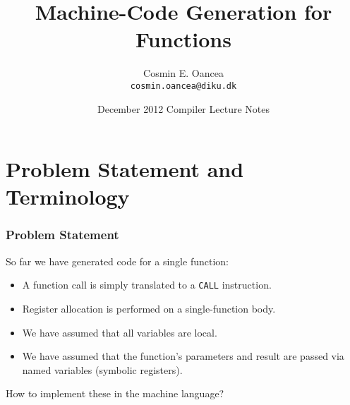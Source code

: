 \documentclass{beamer}
\title[Functions]{Machine-Code Generation for Functions}
\author[C.~Oancea]{Cosmin E. Oancea\\{\tt cosmin.oancea@diku.dk}}
\institute{Department of Computer Science (DIKU)\\University of Copenhagen}
\date[December 2012]{December 2012 Compiler Lecture Notes}
\newcommand{\emp}[1]{\textcolor{DikuRed}{ #1}}
\begin{document}
\titleslide



\begin{frame}[fragile]
	\tableofcontents
\end{frame}

\section{Problem Statement and Terminology}

\begin{frame}[fragile,t]
   \frametitle{Problem Statement}

\bigskip

So far we have generated code for a single function:

\bigskip

\begin{itemize}

    \item A function call is simply translated to a {\tt CALL} instruction.\bigskip

    \item Register allocation is performed on a single-function body.\bigskip

    \item We have assumed that all variables are local.\bigskip

    \item We have assumed that the function's parameters and result are
            passed via  named variables (symbolic registers).

\end{itemize}

\bigskip

\emp{How to implement these in the machine language?}

\end{frame}
\end{document}
